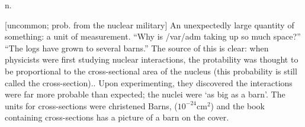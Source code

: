  n.

[uncommon; prob. from the nuclear military] An unexpectedly large quantity of
something: a unit of measurement. ``Why is /var/adm taking up so much space?''
``The logs have grown to several barns.'' The source of this is clear: when
physicists were first studying nuclear interactions, the protability was thought
to be proportional to the cross-sectional area of the nucleus (this probability
is still called the cross-section).. Upon experimenting, they discovered the
interactions were far more probable than expected; the nuclei were `as big as a
barn'. The units for cross-sections were christened Barns, ($10^{-24}\mbox{
cm}^2$) and the book containing cross-sections has a picture of a barn on the
cover.

